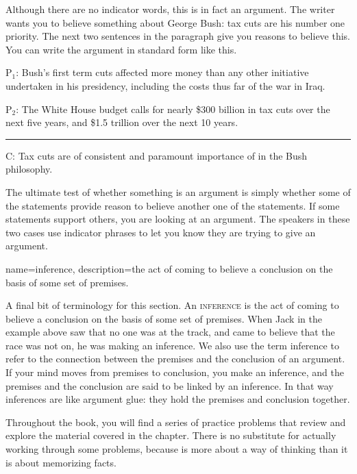 Although there are no indicator words, this is in fact an argument. The writer wants you to believe something about George Bush: tax cuts are his number one priority. The next two sentences in the paragraph give you reasons to believe this. You can write the argument in standard form like this.

\begin{earg}
\item[P$_1$:] Bush's first term cuts affected more money than any other initiative undertaken in his presidency, including the costs thus far of the war in Iraq. 
\item[P$_2$:] The White House budget calls for nearly \$300 billion in tax cuts over the next five years, and \$1.5 trillion over the next 10 years. 
\vspace{-.5em}
\item [] \rule{0.9\linewidth}{.5pt} 
\item[C:] Tax cuts are of consistent and paramount importance of in the Bush philosophy.
\end{earg} 

The ultimate test of whether something is an argument is simply whether some of the statements provide reason to believe another one of the statements. If some statements support others, you are looking at an argument. The speakers in these two cases use indicator phrases to let you know they are trying to give an argument.

{
name=inference,
description={the act of coming to believe a conclusion on the basis of some set of premises.}
}

A final bit of terminology for this section. An \textsc{\gls{inference}} \label{def:Inference} is the act of coming to believe a conclusion on the basis of some set of premises. When Jack in the example above saw that no one was at the track, and came to believe that the race was not on, he was making an inference. We also use the term inference to refer to the connection between the premises and the conclusion of an argument. If your mind moves from premises to conclusion, you make an inference, and the premises and the conclusion are said to be linked by an inference. In that way inferences are like argument glue: they hold the premises and conclusion together. 



\practiceproblems
Throughout the book, you will find a series of practice problems that review and explore the material covered in the chapter. There is no substitute for actually working through some problems, because  is more about a way of thinking than it is about memorizing facts. %

